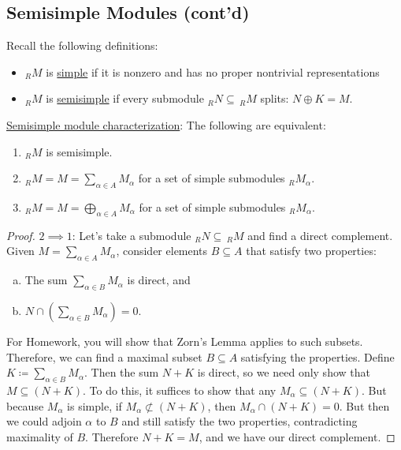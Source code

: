 \documentclass[12pt]{article}
\theoremstyle{definition}
\begin{document}
\subsection{Semisimple Modules (cont'd)}
Recall the following definitions:
\begin{itemize}
    \item $_RM$ is \underline{simple} if it is nonzero and has no proper nontrivial representations
    \item $_RM$ is \underline{semisimple} if every submodule $_RN\subseteq\,_RM$ splits: $N\oplus K=M$.
\end{itemize}
\noindent \underline{Semisimple module characterization}: The following are equivalent:
\begin{enumerate}
    \item $_RM$ is semisimple.
    \item $_RM=M=\sum\limits_{\alpha\in A}M_{\alpha}$ for a set of simple submodules $_RM_{\alpha}$.
    \item $_RM=M=\bigoplus\limits_{\alpha\in A}M_{\alpha}$ for a set of simple submodules $_RM_{\alpha}$.
\end{enumerate}
\begin{proof}
$2\implies1$: Let's take a submodule $_RN\subseteq\,_RM$ and find a direct complement. Given $M=\sum\limits_{\alpha\in A}M_{\alpha}$, consider elements $B\subseteq A$ that satisfy two properties:
\begin{enumerate}[(a)]
    \item The sum $\sum\limits_{\alpha\in B}M_{\alpha}$ is direct, and 
    \item $N\cap\left(\sum\limits_{\alpha\in B}M_{\alpha}\right)=0$.
\end{enumerate}
For Homework, you will show that Zorn's Lemma applies to such subsets. Therefore, we can find a maximal subset $B\subseteq A$ satisfying the properties. Define $K\coloneqq \sum\limits_{\alpha\in B}M_{\alpha}$. Then the sum $N+K$ is direct, so we need only show that $M\subseteq(N+K)$. To do this, it suffices to show that any $M_{\alpha}\subseteq(N+K)$. But because $M_{\alpha}$ is simple, if $M_{\alpha}\not\subset(N+K)$, then $M_{\alpha}\cap(N+K)=0$. But then we could adjoin $\alpha$ to $B$ and still satisfy the two properties, contradicting maximality of $B$. Therefore $N+K=M$, and we have our direct complement.
\end{proof}
\end{document}
